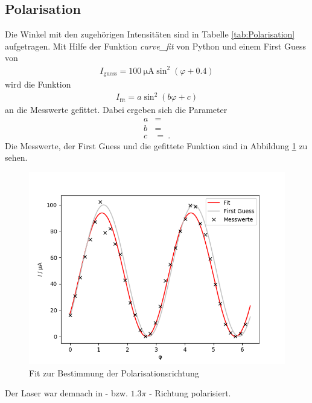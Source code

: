 \subsection{Polarisation}
Die Winkel mit den zugehörigen Intensitäten sind in Tabelle \ref{tab:Polarisation} aufgetragen. Mit Hilfe der Funktion \textit{curve\_fit} von Python und einem First Guess von
\begin{align*}
	I_\text{guess} = \SI{100}{\micro\ampere}\sin^2(\varphi + 0.4)
\end{align*}
wird die Funktion
\begin{align*}
	I_\text{fit} = a\sin^2\left(b\varphi + c\right)
\end{align*}
an die Messwerte gefittet. Dabei ergeben sich die Parameter
\begin{align}
	a &=  \\
	b &=  \\
	c &=  \ .
\end{align}
Die Messwerte, der First Guess und die gefittete Funktion sind in Abbildung \ref{fig:fitPol} zu sehen.
\begin{figure}[h!]
	\centering
	\includegraphics[width=.6\textwidth]{Fit_Polarisation.png}
	\caption{Fit zur Bestimmung der Polarisationsrichtung}
	\label{fig:fitPol}
\end{figure}
Der Laser war demnach in - bzw. $1.3\pi$ - Richtung polarisiert.
